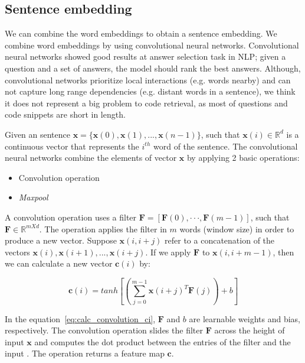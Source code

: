 \documentclass[sigconf]{acmart}
\begin{document}
\subsection{Sentence embedding}

We can combine the word embeddings to obtain a sentence embedding. We combine word embeddings by using convolutional neural networks. Convolutional neural networks showed good results at answer selection task in NLP; given a question and a set of answers, the model should rank the best answers. Although, convolutional networks prioritize local interactions (e.g. words nearby) and can not capture long range dependencies (e.g. distant words in a sentence), we think it does not represent a big problem to code retrieval, as most of questions and code snippets are short in length.

Given an sentence $\bm{x} = \{ \bm{x}(0), \bm{x}(1), . . ., \bm{x}(n - 1) \}$, such that $\bm{x}(i) \in \mathbb{R}^{d}$ is a continuous vector that represents the $i^{th}$ word of the sentence. The convolutional neural networks combine the elements of vector $\bm{x}$ by applying 2 basic operations:

\begin{itemize}
    \item Convolution operation
    \item \textit{Maxpool}
\end{itemize}

A convolution operation uses a filter $\bm{F}  = [\bm{F}(0),· · ·, \bm{F}(m - 1)]$, such that $\bm{F} \in \mathbb{R}^{m X d}$. The operation applies the filter in $m$ words (window size) in order to produce a new vector. Suppose $\bm{x}(i, i + j)$ refer to a concatenation of the vectors $\bm{x}(i), \bm{x}(i + 1), . . ., \bm{x}(i + j)$. If we apply $\bm{F}$ to $\bm{x}(i, i + m - 1)$, then we can calculate a new vector $\bm{c}(i)$ by:

\begin{equation}\label{eq:calc_convolution_ci}
    \bm{c}(i) = tanh \left[\left(\sum_{j=0}^{m - 1} \bm{x}(i + j)^{T}\bm{F}(j)\right) + b\right]
\end{equation}

In the equation~\ref{eq:calc_convolution_ci}, $\bm{F}$ and $b$ are learnable weights and bias, respectively. The convolution operation slides the filter $\bm{F}$ across the height of input $\bm{x}$ and computes the dot product between the entries of the filter and the input \cite{karpathy-course-cnn-2016}. The operation returns a feature map $\bm{c}$.
\end{document}

